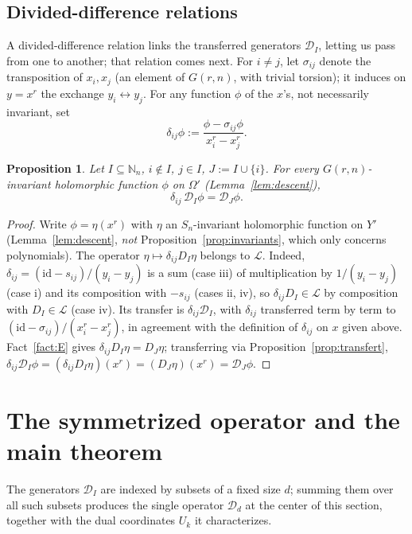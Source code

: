 \documentclass[11pt]{article}
\newtheorem{proposition}[theorem]{Proposition}
\theoremstyle{remark}
\newcommand{\NN}{\mathbb{N}}
\begin{document}
\subsection{Divided-difference relations}

A divided-difference relation links the transferred generators $\mathcal D_I$, letting us pass from one to another; that relation comes next. For $i\neq j$, let $\sigma_{ij}$ denote the transposition of $x_i,x_j$ (an element of $G(r,n)$, with trivial torsion); it induces on $y=x^r$ the exchange $y_i\leftrightarrow y_j$. For any function $\phi$ of the $x$'s, not necessarily invariant, set
\[
\delta_{ij}\phi := \frac{\phi - \sigma_{ij}\phi}{x_i^r - x_j^r}.
\]

\begin{proposition}\label{prop:prop5}
Let $I\subseteq\NN_n$, $i\notin I$, $j\in I$, $J:=I\cup\{i\}$. For every $G(r,n)$-invariant holomorphic function $\phi$ on $\Omega'$ (Lemma~\ref{lem:descent}),
\[
\delta_{ij}\,\mathcal D_I\phi = \mathcal D_J\phi .
\]
\end{proposition}

\begin{proof}
Write $\phi=\eta(x^r)$ with $\eta$ an $S_n$-invariant holomorphic function on $Y'$ (Lemma~\ref{lem:descent}, \emph{not} Proposition~\ref{prop:invariants}, which only concerns polynomials). The operator $\eta\mapsto \delta_{ij}D_I\eta$ belongs to $\mathcal L$. Indeed, $\delta_{ij}=(\mathrm{id}-s_{ij})/(y_i-y_j)$ is a sum (case iii) of multiplication by $1/(y_i-y_j)$ (case i) and its composition with $-s_{ij}$ (cases ii, iv), so $\delta_{ij}D_I\in\mathcal L$ by composition with $D_I\in\mathcal L$ (case iv). Its transfer is $\delta_{ij}\mathcal D_I$, with $\delta_{ij}$ transferred term by term to $(\mathrm{id}-\sigma_{ij})/(x_i^r-x_j^r)$, in agreement with the definition of $\delta_{ij}$ on $x$ given above. Fact~\ref{fact:E} gives $\delta_{ij}D_I\eta=D_J\eta$; transferring via Proposition~\ref{prop:transfert}, $\delta_{ij}\mathcal D_I\phi = (\delta_{ij}D_I\eta)(x^r) = (D_J\eta)(x^r) = \mathcal D_J\phi$.
\end{proof}

\section{The symmetrized operator and the main theorem}

The generators $\mathcal D_I$ are indexed by subsets of a fixed size $d$; summing them over all such subsets produces the single operator $\mathcal D_d$ at the center of this section, together with the dual coordinates $U_k$ it characterizes.
\end{document}

